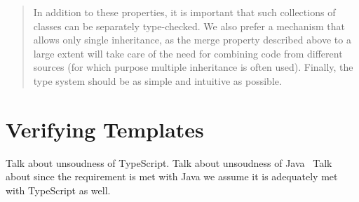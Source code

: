 \begin{quotation}
    In  addition  to  these  properties,  it  is  important  that  such  collections  of  classes  can  be  separately type-checked.
    We also prefer a mechanism that allows only single inheritance, as  the  merge  property  described  above  to  a  large  extent  will  take  care  of  the  need  for  combining  code  from  different  sources  (for  which  purpose  multiple  inheritance  is  often  used).
    Finally, the type system should be as simple and intuitive as possible.
\end{quotation}

\section{Verifying Templates}\label{sec:pt-requirements-verifying-templates}

Talk about unsoudness of TypeScript.
Talk about unsoudness of Java~\cite{java-unsound}
Talk about since the requirement is met with Java we assume it is adequately met with TypeScript as well.

